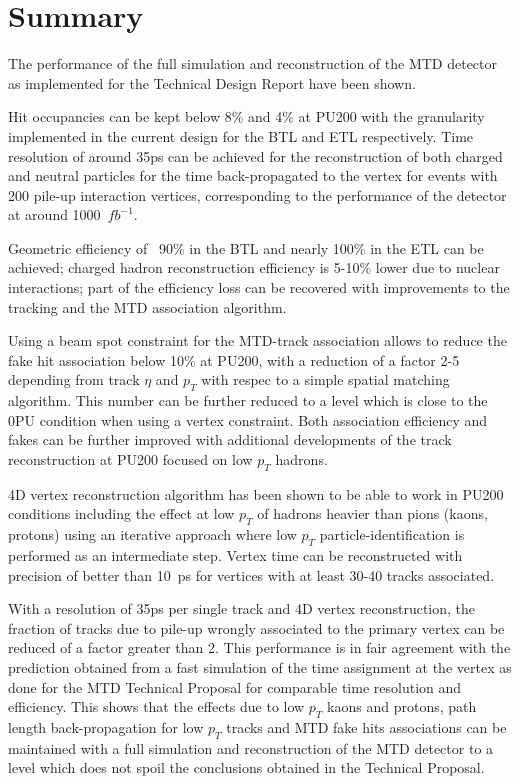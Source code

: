 \section{Summary}
The performance of the full simulation and reconstruction of the MTD detector as implemented for the Technical Design Report have been shown. 

Hit occupancies can be kept below 8\% and 4\% at PU200 with the granularity implemented in the current design for the BTL and ETL respectively. Time resolution of around 35ps can be achieved for the reconstruction of both charged and neutral particles for the time back-propagated to the vertex for events with 200 pile-up interaction vertices, corresponding to the performance of the detector at around 1000~$fb^{-1}$.

Geometric efficiency of ~90\% in the BTL and nearly 100\% in the ETL can be achieved; charged hadron reconstruction efficiency is 5-10\% lower due to nuclear interactions; part of the efficiency loss can be recovered with improvements to the tracking and the MTD association algorithm. 

Using a beam spot constraint for the MTD-track association allows to reduce the fake hit association below 10\% at PU200, with a reduction of a factor 2-5 depending from track $\eta$ and $p_{T}$ with respec to a simple spatial matching algorithm. This number can be further reduced to a level which is close to the 0PU condition when using a vertex constraint. Both association efficiency and fakes can be further improved with additional developments of the track reconstruction at PU200 focused on low $p_{T}$ hadrons. 

4D vertex reconstruction algorithm has been shown to be able to work in PU200 conditions including the effect at low $p_{T}$ of hadrons heavier than pions (kaons, protons) using an iterative approach where low $p_{T}$ particle-identification is performed as an intermediate step. Vertex time can be reconstructed with precision of better than 10~ps for vertices with at least 30-40 tracks associated. 

With a resolution of 35ps per single track and 4D vertex reconstruction, the fraction of tracks due to pile-up wrongly associated to the primary vertex can be reduced of a factor greater than 2. This performance is in fair agreement with the prediction obtained from a fast simulation of the time assignment at the vertex as done for the MTD Technical Proposal for comparable time resolution and efficiency. This shows that the effects due to low $p_{T}$ kaons and protons, path length back-propagation for low $p_{T}$ tracks and MTD fake hits associations can be maintained with a full simulation and reconstruction of the MTD detector to a level which does not spoil the conclusions obtained in the Technical Proposal. 